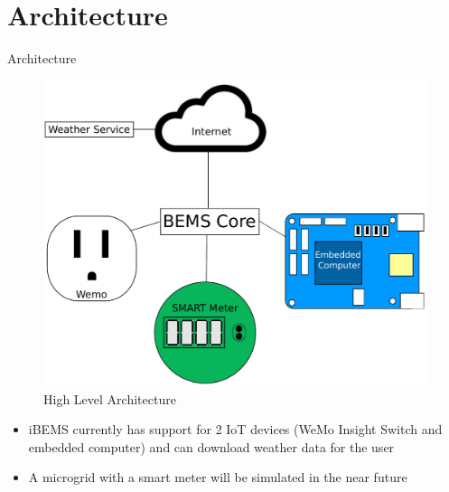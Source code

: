 \documentclass{beamer}
\begin{document}
\section{Architecture}
\begin{frame}{Architecture}{} %
    \begin{multicols}{2}
        \begin{figure}
            \centering
            \includegraphics[scale=0.3]{figs/highLevelArchitecture.pdf}
            \caption{High Level Architecture}
            \label{fig:high_level_arch}
        \end{figure}
        \textsc{}
        \begin{itemize}
            \item iBEMS currently has support for 2 IoT devices (WeMo Insight Switch and embedded computer) and can download weather data for the user
            \item A microgrid with a smart meter will be simulated in the near future
        \end{itemize}        
    \end{multicols}
\end{frame}
\end{document}
